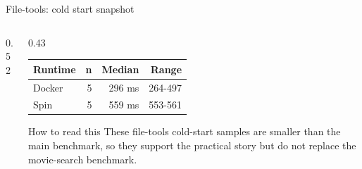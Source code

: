 \documentclass[aspectratio=169,10pt]{beamer}
\begin{document}
\begin{frame}{File-tools: cold start snapshot}
  \begin{columns}[T,onlytextwidth]
    \begin{column}{0.52\linewidth}
    \end{column}
    \begin{column}{0.43\linewidth}
      \begin{table}
        \centering
        \small
        \begin{tabular}{lrrr}
          \toprule
          Runtime & n & Median & Range \\
          \midrule
          Docker & 5 & 296 ms & 264-497 \\
          Spin & 5 & 559 ms & 553-561 \\
          \bottomrule
        \end{tabular}
      \end{table}

      \begin{block}{How to read this}
        These file-tools cold-start samples are smaller than the main benchmark, so they support the practical story but do not replace the movie-search benchmark.
      \end{block}
    \end{column}
  \end{columns}
\end{frame}
\end{document}
